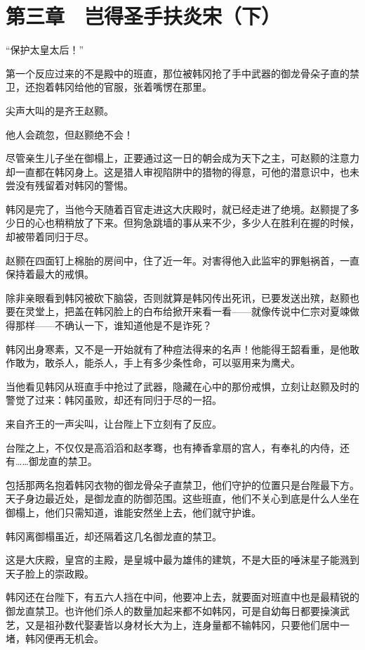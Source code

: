 \section{第三章　岂得圣手扶炎宋（下）}

“保护太皇太后！”

第一个反应过来的不是殿中的班直，那位被韩冈抢了手中武器的御龙骨朵子直的禁卫，还抱着韩冈给他的官服，张着嘴愣在那里。

尖声大叫的是齐王赵颢。

他人会疏忽，但赵颢绝不会！

尽管亲生儿子坐在御榻上，正要通过这一日的朝会成为天下之主，可赵颢的注意力却一直都在韩冈身上。这是猎人审视陷阱中的猎物的得意，可他的潜意识中，也未尝没有残留着对韩冈的警惕。

韩冈是完了，当他今天随着百官走进这大庆殿时，就已经走进了绝境。赵颢提了多少日的心也稍稍放了下来。但狗急跳墙的事从来不少，多少人在胜利在握的时候，却被带着同归于尽。

赵颢在四面钉上棉胎的房间中，住了近一年。对害得他入此监牢的罪魁祸首，一直保持着最大的戒惧。

除非亲眼看到韩冈被砍下脑袋，否则就算是韩冈传出死讯，已要发送出殡，赵颢也要在灵堂上，把盖在韩冈脸上的白布给掀开来看一看——就像传说中仁宗对夏竦做得那样——不确认一下，谁知道他是不是诈死？

韩冈出身寒素，又不是一开始就有了种痘法得来的名声！他能得王韶看重，是他敢作敢为，敢杀人，能杀人，手上有多少条性命，可以驱用来为鹰犬。

当他看见韩冈从班直手中抢过了武器，隐藏在心中的那份戒惧，立刻让赵颢及时的警觉了过来：韩冈虽败，却还有同归于尽的一招。

来自齐王的一声尖叫，让台陛上下立刻有了反应。

台陛之上，不仅仅是高滔滔和赵孝骞，也有捧香拿扇的宫人，有奉礼的内侍，还有……御龙直的禁卫。

包括那两名抱着韩冈衣物的御龙骨朵子直禁卫，他们守护的位置只是台陛最下方。天子身边最近处，是御龙直的防御范围。这些班直，他们不关心到底是什么人坐在御榻上，他们只需知道，谁能安然坐上去，他们就守护谁。

韩冈离御榻虽近，却还隔着这几名御龙直的禁卫。

这是大庆殿，皇宫的主殿，是皇城中最为雄伟的建筑，不是大臣的唾沫星子能溅到天子脸上的崇政殿。

韩冈还在台陛下，有五六人挡在中间，他要冲上去，就要面对班直中也是最精锐的御龙直禁卫。也许他们杀人的数量加起来都不如韩冈，可是自幼每日都要操演武艺，又是祖孙数代娶妻皆以身材长大为上，连身量都不输韩冈，只要他们居中一堵，韩冈便再无机会。

